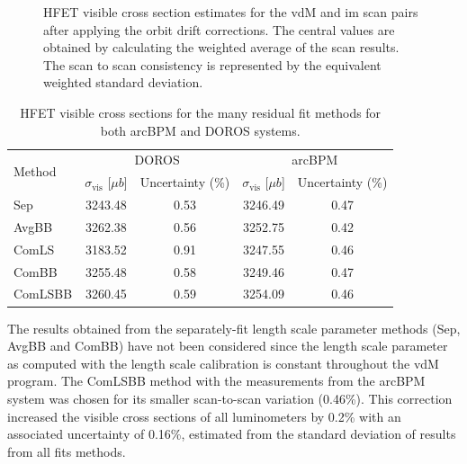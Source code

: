 \begin{figure}[!htb]
	\centering
	\caption[Comparison of residual orbit fit methods]{HFET visible cross section estimates for the vdM and im scan pairs after applying the orbit drift corrections. The central values are obtained by calculating the weighted average of the scan results. The scan to scan consistency is represented by the equivalent weighted standard deviation.}
	\label{fig:rod_xsec_methods_results}
\end{figure}

\begin{table}[!htb]
    \centering
    \caption{HFET visible cross sections for the many residual fit methods for both arcBPM and DOROS systems.}
    \label{tb:hfet_rod_xsec}
    \begin{tabular}{lcc|cc}
        \hline
        \multirow{2}{*}{Method} & \multicolumn{2}{c|}{DOROS} & \multicolumn{2}{c}{arcBPM} \\
        \cline{2-5}
         & $\sigma_{\mathrm{vis}}$ [$\mu b$] & Uncertainty (\%) & $\sigma_{\mathrm{vis}}$ [$\mu b$] & Uncertainty (\%) \\
        \hline
        Sep     & 3243.48 & 0.53 & 3246.49 & 0.47 \\
        AvgBB   & 3262.38 & 0.56 & 3252.75 & 0.42 \\
        ComLS   & 3183.52 & 0.91 & 3247.55 & 0.46 \\
        ComBB   & 3255.48 & 0.58 & 3249.46 & 0.47 \\
        ComLSBB & 3260.45 & 0.59 & 3254.09 & 0.46 \\
        \hline
    \end{tabular}
\end{table}


The results obtained from the separately-fit length scale parameter methods (Sep, AvgBB and ComBB) have not been considered since the length scale parameter as computed with the length scale calibration is constant throughout the vdM program. The ComLSBB method with the measurements from the arcBPM system was chosen for its smaller scan-to-scan variation (0.46\%). This correction increased the visible cross sections of all luminometers by 0.2\% with an associated uncertainty of 0.16\%, estimated from the standard deviation of results from all fits methods.

